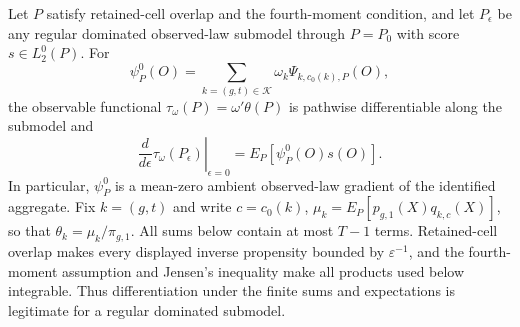 Let \(P\) satisfy retained-cell overlap and the fourth-moment condition, and let \(P_\epsilon\) be any regular dominated observed-law submodel through \(P=P_0\) with score \(s\in L_2^0(P)\).  For
\[
\psi_P^0(O)=\sum_{k=(g,t)\in\mathcal K}\omega_k\Psi_{k,c_0(k),P}(O),
\]
the observable functional \(\tau_\omega(P)=\omega'\theta(P)\) is pathwise differentiable along the submodel and
\[
\left.\frac{d}{d\epsilon}\tau_\omega(P_\epsilon)\right|_{\epsilon=0}
=E_P[\psi_P^0(O)s(O)].
\]
In particular, \(\psi_P^0\) is a mean-zero ambient observed-law gradient of the identified aggregate.
Fix \(k=(g,t)\) and write \(c=c_0(k)\), \(\mu_k=E_P[p_{g,1}(X)q_{k,c}(X)]\), so that \(\theta_k=\mu_k/\pi_{g,1}\).  All sums below contain at most \(T-1\) terms.  Retained-cell overlap makes every displayed inverse propensity bounded by \(\varepsilon^{-1}\), and the fourth-moment assumption and Jensen's inequality make all products used below integrable.  Thus differentiation under the finite sums and expectations is legitimate for a regular dominated submodel.


